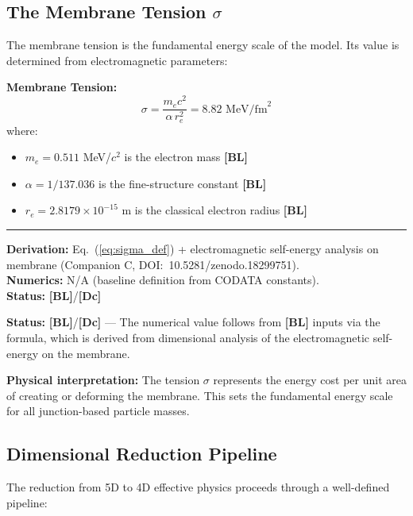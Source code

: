 \documentclass[11pt,a4paper]{article}
\newcommand{\tagDc}{\textcolor{blue!70!black}{\textbf{[Dc]}}}
\newcommand{\tagBL}{\textcolor{gray!70!black}{\textbf{[BL]}}}
\begin{document}
\subsection{The Membrane Tension $\sigma$}

The membrane tension is the fundamental energy scale of the model. Its value is determined from electromagnetic parameters:

\begin{resultbox}
\textbf{Membrane Tension:}
\begin{equation}
    \sigma = \frac{m_e c^2}{\alpha \, r_e^2} = 8.82 \text{ MeV/fm}^2
    \label{eq:sigma_def}
\end{equation}
where:
\begin{itemize}[nosep]
    \item $m_e = 0.511$ MeV/$c^2$ is the electron mass \tagBL{}
    \item $\alpha = 1/137.036$ is the fine-structure constant \tagBL{}
    \item $r_e = 2.8179 \times 10^{-15}$ m is the classical electron radius \tagBL{}
\end{itemize}

\vspace{0.3em}\hrule\vspace{0.3em}
\textbf{Derivation:} Eq.~(\ref{eq:sigma_def}) + electromagnetic self-energy analysis on membrane (Companion C, DOI:~10.5281/zenodo.18299751).\\
\textbf{Numerics:} N/A (baseline definition from CODATA constants).\\
\textbf{Status:} \tagBL{}/\tagDc{}
\end{resultbox}

\textbf{Status:} \tagBL{}/\tagDc{} --- The numerical value follows from \tagBL{} inputs via the formula, which is derived from dimensional analysis of the electromagnetic self-energy on the membrane.

\textbf{Physical interpretation:} The tension $\sigma$ represents the energy cost per unit area of creating or deforming the membrane. This sets the fundamental energy scale for all junction-based particle masses.

\subsection{Dimensional Reduction Pipeline}

The reduction from 5D to 4D effective physics proceeds through a well-defined pipeline:
\end{document}
